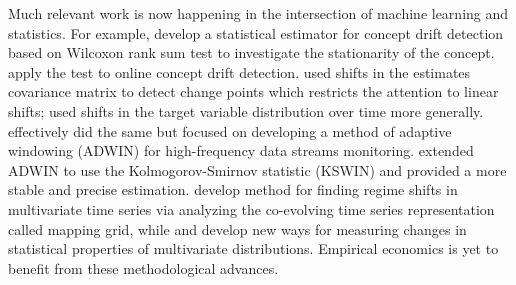 Much relevant work is now happening in the intersection of machine learning and statistics. For example, \cite{Barros} develop a statistical estimator for concept drift detection based on Wilcoxon rank sum test to investigate the stationarity of the concept. \cite{Baidari} apply  the  \cite{Bhattacharyya}  test to online concept drift detection. \cite{Wang} used shifts in the estimates covariance matrix to detect change points which restricts the attention to linear shifts; \cite{Ditzler} used shifts in the target variable distribution over time  more generally. \cite{Bifet} effectively did the same but focused on developing a method of adaptive windowing (ADWIN) for high-frequency data streams monitoring. \cite{Raab} extended ADWIN to use the Kolmogorov-Smirnov statistic (KSWIN) and provided a more stable and precise estimation. 
\cite{Tajeuna}  develop method for finding regime shifts in multivariate time series via analyzing the co-evolving time series representation called mapping grid, while \cite{Yuxuan} and \cite{Alanqary} develop new ways for measuring  changes in statistical properties of multivariate distributions. Empirical economics is yet to benefit from these methodological advances.

